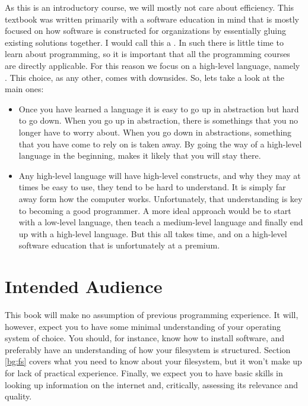 As this is an introductory course, we will mostly not care about efficiency. This textbook was written primarily with a software education in mind that is mostly focused on how software is constructed for organizations by essentially gluing existing solutions together. I would call this a . In such there is little time to learn about programming, so it is important that all the programming courses are directly applicable. For this reason we focus on a high-level language, namely \csharp. This choice, as any other, comes with downsides. So, lets take a look at the main ones:
\begin{itemize}
  \item Once you have learned a language it is easy to go up in abstraction but hard to go down. When you go up in abstraction, there is somethings that you no longer have to worry about. When you go down in abstractions, something that you have come to rely on is taken away. By going the way of a high-level language in the beginning, makes it likely that you will stay there.
  \item Any high-level language will have high-level constructs, and why they may at times be easy to use, they tend to be hard to understand. It is simply far away form how the computer works. Unfortunately, that understanding is key to becoming a good programmer. A more ideal approach would be to start with a low-level language, then teach a medium-level language and finally end up with a high-level language. But this all takes time, and on a high-level software education that is unfortunately at a premium.
\end{itemize}

\section{Intended Audience}

This book will make no assumption of previous programming experience. It will, however, expect you to have some minimal understanding of your operating system of choice. You should, for instance, know how to install software, and preferably have an understanding of how your filesystem is structured. Section \ref{bg:fs} covers what you need to know about your filesystem, but it won't make up for lack of practical experience. Finally, we expect you to have basic skills in looking up information on the internet and, critically, assessing its relevance and quality.

